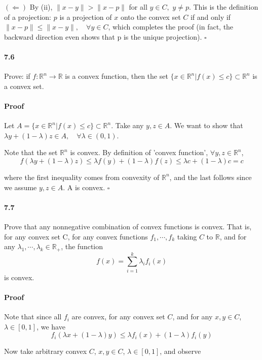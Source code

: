 \documentclass[letterpaper,12pt]{article}
\theoremstyle{definition}
\begin{document}
$(\Leftarrow)$ By (ii), $\| x - y\| > \| x - p \|$ for all $ y \in C,$ $y \neq p$. This is the definition of a projection: $p$ is a projection  of $x$ onto the convex set $C$ if and only if $\| x - p\| \le \| x - y \|, \quad \forall y \in C$, which completes the proof (in fact, the backward direction even shows that p is the unique projection). $\square$


\paragraph{7.6} Prove: if $f: \mathbb{R}^n \rightarrow \mathbb{R}$ is a convex function, then the set $ \{x \in \mathbb{R}^n | f(x) \le c\} \subset \mathbb{R}^n$ is a convex set.

\paragraph{Proof} Let $A = \{x \in \mathbb{R}^n | f(x) \le c\} \subset \mathbb{R}^n$. Take any $y, z \in A$. We want to show that $\lambda y + (1 - \lambda) z \in A, \quad \forall \lambda \in (0,1)$.

Note that the set $\mathbb{R}^n$ is convex. By definition of 'convex function', $\forall y, z \in \mathbb{R}^n$,  $$f(\lambda y + (1 - \lambda) z) \le \lambda f(y) + (1 - \lambda) f(z) \le \lambda c + (1 - \lambda) c = c$$

where the first inequality comes from convexity of $\mathbb{R}^n$, and the last follows since we assume $y, z \in A$. A is convex. $\square$

\paragraph{7.7} Prove that any nonnegative combination of convex functions is convex. That is, for any convex set C, for any convex functions $f_1, \cdots, f_k$ taking $C$ to $\mathbb{R}$, and for any $\lambda_1, \cdots, \lambda_k \in \mathbb{R}_+ $, the function 
$$ f(x) = \sum_{ i = 1}^{k} \lambda_i f_i(x)$$ is convex.

\paragraph{Proof} Note that since all $f_i$ are convex, for any convex set $C$, and for any $x, y \in C$, $\lambda \in [0,1]$, we have
$$f_i(\lambda x + (1 - \lambda)y) \le \lambda f_i(x) + (1 - \lambda)f_i(y)$$

Now take arbitrary convex $C$, $x,y \in C$, $\lambda \in [0,1]$, and observe 
\end{document}
